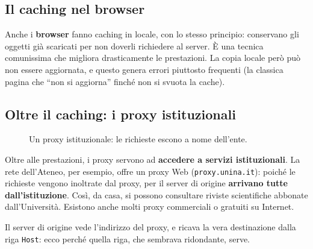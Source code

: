 \subsection{Il caching nel browser}

Anche i \textbf{browser} fanno caching in locale, con lo stesso principio: conservano gli oggetti già
scaricati per non doverli richiedere al server. È una tecnica comunissima che migliora drasticamente
le prestazioni. La copia locale però può non essere aggiornata, e questo genera errori piuttosto
frequenti (la classica pagina che ``non si aggiorna'' finché non si svuota la cache).

\subsection{Oltre il caching: i proxy istituzionali}

\begin{figure}[H]
\centering
{}
\caption{Un proxy istituzionale: le richieste escono a nome dell'ente.}
\end{figure}

Oltre alle prestazioni, i proxy servono ad \textbf{accedere a servizi istituzionali}. La rete
dell'Ateneo, per esempio, offre un proxy Web (\texttt{proxy.unina.it}): poiché le richieste vengono
inoltrate dal proxy, per il server di origine \textbf{arrivano tutte dall'istituzione}. Così, da casa, si
possono consultare riviste scientifiche abbonate dall'Università. Esistono anche molti proxy
commerciali o gratuiti su Internet.

Il server di origine vede l'indirizzo del proxy, e ricava la vera destinazione dalla riga \texttt{Host}: ecco
perché quella riga, che sembrava ridondante, serve.

